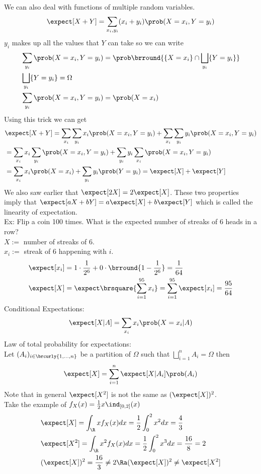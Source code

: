 We can also deal with functions of multiple random variables.\\
\[\expect[X+Y]=\sum_{x_i,y_i}(x_i+y_i)\prob(X=x_i,Y=y_i)\]
$y_i$ makes up all the values that $Y$ can take so we can write
\begin{align*}
    &\sum_{y_i}\prob(X=x_i,Y=y_i)=\prob\brround{\{X=x_i\}\cap\bigsqcup_{y_i}\{Y=y_i\}}\\
    &\bigsqcup_{y_i}\{Y=y_i\}=\Omega\\
    &\sum_{y_i}\prob(X=x_i,Y=y_i)=\prob(X=x_i)
\end{align*}
Using this trick we can get
\begin{align*}
    &\expect[X+Y]=\sum_{x_i}\sum_{y_i}x_i\prob(X=x_i,Y=y_i)+\sum_{x_i}\sum_{y_i}y_i\prob(X=x_i,Y=y_i)\\
    &=\sum_{x_i}x_i\sum_{y_i}\prob(X=x_i,Y=y_i)+\sum_{y_i}y_i\sum_{x_i}\prob(X=x_i,Y=y_i)\\
    &=\sum_{x_i}x_i\prob(X=x_i)+\sum_{y_i}y_i\prob(Y=y_i)=\expect[X]+\expect[Y]
\end{align*}
We also saw earlier that $\expect[2X]=2\expect[X]$. These two properties imply that $\expect[aX+bY]=a\expect[X]+b\expect[Y]$ which is called the linearity of expectation.\\
Ex: Flip a coin 100 times. What is the expected number of streaks of 6 heads in a row?\\
$X:=$ number of streaks of 6.\\ 
$x_i:=$ streak of 6 happening with $i$.
\begin{align*}
    &\expect[x_i]=1\cdot\frac{1}{2^6}+0\cdot\brround{1-\frac{1}{2^6}}=\frac{1}{64}\\
    &\expect[X]=\expect\brsquare{\sum_{i=1}^{95}x_i}=\sum_{i=1}^{95}\expect[x_i]=\frac{95}{64}
\end{align*}
Conditional Expectations:\\
\[\expect[X|A]=\sum_{x_i}x_i\prob(X=x_i|A)\]
Law of total probability for expectations:\\
Let $(A_i)_{i\in\brcurly{1,\ldots,n}}$ be a partition of $\Omega$ such that $\bigsqcup\limits_{i=1}^n A_i=\Omega$ then
\[\expect[X]=\sum_{i=1}^n\expect[X|A_i]\prob(A_i)\]
Note that in general $\expect[X^2]$ is not the same as $(\expect[X])^2$.\\
Take the example of $f_X(x)=\frac{1}{2}x\ind_{[0,2]}(x)$
\begin{align*}
    &\expect[X]=\int_\R xf_X(x)dx=\frac{1}{2}\int_0^2x^2dx=\frac{4}{3}\\
    &\expect[X^2]=\int_\R x^2f_X(x)dx=\frac{1}{2}\int_0^2x^3dx=\frac{16}{8}=2\\
    &(\expect[X])^2=\frac{16}{3}\neq2\Ra (\expect[X])^2\neq\expect[X^2]
\end{align*}

